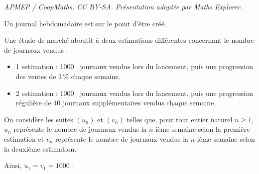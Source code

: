 \documentclass[10pt]{article}
\providecommand{\np}[2][]{{#2~#1}}
\begin{document}
\noindent\textit{APMEP / CoopMaths. CC BY-SA. Présentation adaptée par Maths Explorer.}\par\medskip
\medskip

Un journal hebdomadaire est sur le point d'être créé.

Une étude de marché aboutit à deux estimations différentes concernant le nombre de journaux vendus :
\begin{itemize}
\item  1 estimation : \np{1000} journaux vendus lors du lancement, puis une progression des ventes de 3\,\% chaque semaine.
\item 2 estimation : \np{1000} journaux vendus lors du lancement, puis une progression régulière de 40 journaux supplémentaires vendus chaque semaine.
 \end{itemize}
On considère les suites $\left(u_n\right)$ et $\left(v_n\right)$ telles que, pour tout entier naturel $n\geqslant 1$, $u_n$ représente le nombre de journaux vendus la $n$-ième semaine selon la première estimation et $v_n$ représente le nombre de journaux vendus la $n$-ième semaine selon la deuxième estimation. 

Ainsi, $u_1 = v_1 = \np{1000}$.

\medskip
\end{document}

